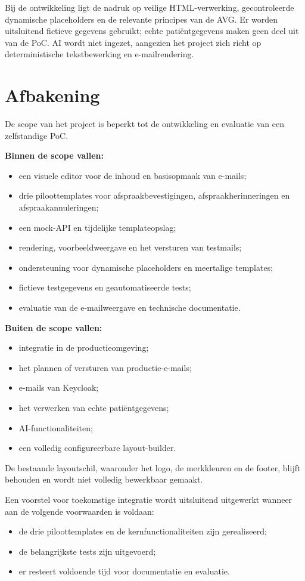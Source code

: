 Bij de ontwikkeling ligt de nadruk op veilige HTML-verwerking,
gecontroleerde dynamische placeholders en de relevante principes van
de AVG. Er worden uitsluitend fictieve gegevens gebruikt; echte
patiëntgegevens maken geen deel uit van de PoC. AI wordt niet ingezet,
aangezien het project zich richt op deterministische tekstbewerking
en e-mailrendering.

\section{Afbakening}
De scope van het project is beperkt tot de ontwikkeling en evaluatie
van een zelfstandige PoC.

\textbf{Binnen de scope vallen:}
\begin{itemize}
    \item een visuele editor voor de inhoud en basisopmaak van e-mails;
    \item drie piloottemplates voor afspraakbevestigingen,
    afspraakherinneringen en afspraakannuleringen;
    \item een mock-API en tijdelijke templateopslag;
    \item rendering, voorbeeldweergave en het versturen van testmails;
    \item ondersteuning voor dynamische placeholders en meertalige
    templates;
    \item fictieve testgegevens en geautomatiseerde tests;
    \item evaluatie van de e-mailweergave en technische documentatie.
\end{itemize}

\textbf{Buiten de scope vallen:}
\begin{itemize}
    \item integratie in de productieomgeving;
    \item het plannen of versturen van productie-e-mails;
    \item e-mails van Keycloak;
    \item het verwerken van echte patiëntgegevens;
    \item AI-functionaliteiten;
    \item een volledig configureerbare layout-builder.
\end{itemize}

De bestaande layoutschil, waaronder het logo, de merkkleuren en de
footer, blijft behouden en wordt niet volledig bewerkbaar gemaakt.

Een voorstel voor toekomstige integratie wordt uitsluitend uitgewerkt
wanneer aan de volgende voorwaarden is voldaan:
\begin{itemize}
    \item de drie piloottemplates en de kernfunctionaliteiten zijn
    gerealiseerd;
    \item de belangrijkste tests zijn uitgevoerd;
    \item er resteert voldoende tijd voor documentatie en evaluatie.
\end{itemize}

